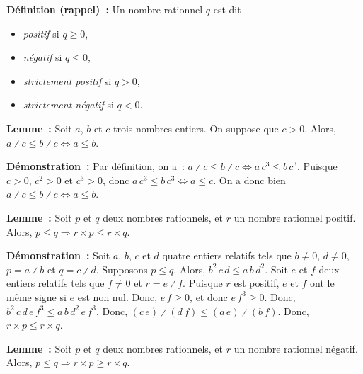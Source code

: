     \done

\medskip

\noindent\textbf{Définition (rappel) :} Un nombre rationnel $q$ est dit
    \begin{itemize}[nosep]
        \item \emph{positif} si $q \geq 0$,
        \item \emph{négatif} si $q \leq 0$,
        \item \emph{strictement positif} si $q > 0$,
        \item \emph{strictement négatif} si $q < 0$.
    \end{itemize}

\medskip

\noindent\textbf{Lemme :} Soit $a$, $b$ et $c$ trois nombres entiers.
    On suppose que $c > 0$.
    Alors, $a \divslash c \leq b \divslash c \Leftrightarrow a \leq b$.

\medskip

\noindent\textbf{Démonstration :} Par définition, on a : $a \divslash c \leq b \divslash c \Leftrightarrow a \, c^3 \leq b \, c^3$.
    Puisque $c > 0$, $c^2 > 0$ et $c^3 > 0$, donc $a \, c^3 \leq b \, c^3 \Leftrightarrow a \leq c$.
    On a donc bien $a \divslash c \leq b \divslash c \Leftrightarrow a \leq b$.

    \done

\medskip

\noindent\textbf{Lemme :} Soit $p$ et $q$ deux nombres rationnels, et $r$ un nombre rationnel positif. 
    Alors, $p \leq q \Rightarrow r \times p \leq r \times q$.

\medskip

\noindent\textbf{Démonstration :}
    Soit $a$, $b$, $c$ et $d$ quatre entiers relatifs tels que $b \neq 0$, $d \neq 0$, $p = a \divslash b$ et $q = c \divslash d$.
    Supposons $p \leq q$.
    Alors, $b^2 \, c \, d \leq a \, b \, d^2$.
    Soit $e$ et $f$ deux entiers relatifs tels que $f \neq 0$ et $r = e \divslash f$.
    Puisque $r$ est positif, $e$ et $f$ ont le même signe si $e$ est non nul. 
    Donc, $e \, f \geq 0$, et donc $e \, f^3 \geq 0$.
    Donc, $b^2 \, c \, d \, e \, f^3 \leq a \, b \, d^2 \, e \, f^3$. 
    Donc, $(c \, e) \divslash (d \, f) \leq (a \, e) \divslash (b \, f)$. 
    Donc, $r \times p \leq r \times q$.

    \done

\medskip

\noindent\textbf{Lemme :} Soit $p$ et $q$ deux nombres rationnels, et $r$ un nombre rationnel négatif. 
    Alors, $p \leq q \Rightarrow r \times p \geq r \times q$.

